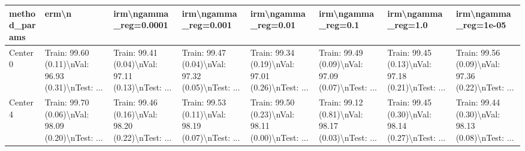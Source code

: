 \begin{tabular}{llllllll}
\toprule
method\_params &                                              erm\textbackslash n &                              irm\textbackslash ngamma\_reg=0.0001 &                               irm\textbackslash ngamma\_reg=0.001 &                                irm\textbackslash ngamma\_reg=0.01 &                                 irm\textbackslash ngamma\_reg=0.1 &                                 irm\textbackslash ngamma\_reg=1.0 &                               irm\textbackslash ngamma\_reg=1e-05 \\
\midrule
Center 0 &  Train: 99.60 (0.11)\textbackslash nVal: 96.93 (0.31)\textbackslash nTest: ... &  Train: 99.41 (0.04)\textbackslash nVal: 97.11 (0.13)\textbackslash nTest: ... &  Train: 99.47 (0.04)\textbackslash nVal: 97.32 (0.05)\textbackslash nTest: ... &  Train: 99.34 (0.19)\textbackslash nVal: 97.01 (0.26)\textbackslash nTest: ... &  Train: 99.49 (0.09)\textbackslash nVal: 97.09 (0.07)\textbackslash nTest: ... &  Train: 99.45 (0.13)\textbackslash nVal: 97.18 (0.21)\textbackslash nTest: ... &  Train: 99.56 (0.09)\textbackslash nVal: 97.36 (0.22)\textbackslash nTest: ... \\
Center 4 &  Train: 99.70 (0.06)\textbackslash nVal: 98.09 (0.20)\textbackslash nTest: ... &  Train: 99.46 (0.16)\textbackslash nVal: 98.20 (0.22)\textbackslash nTest: ... &  Train: 99.53 (0.11)\textbackslash nVal: 98.19 (0.07)\textbackslash nTest: ... &  Train: 99.50 (0.23)\textbackslash nVal: 98.11 (0.00)\textbackslash nTest: ... &  Train: 99.12 (0.81)\textbackslash nVal: 98.17 (0.03)\textbackslash nTest: ... &  Train: 99.45 (0.30)\textbackslash nVal: 98.14 (0.27)\textbackslash nTest: ... &  Train: 99.44 (0.30)\textbackslash nVal: 98.13 (0.08)\textbackslash nTest: ... \\
\bottomrule
\end{tabular}
